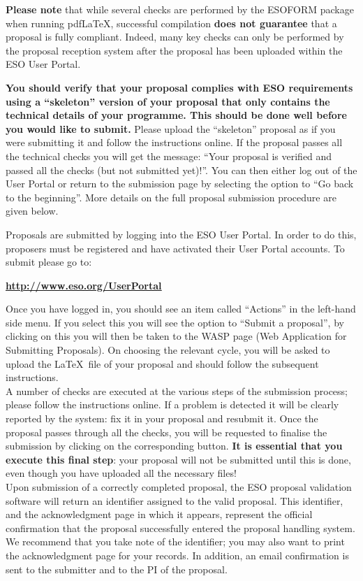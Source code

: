 \documentclass{article}
\begin{document}
{\bf Please note} that while several checks are
performed by the ESOFORM package when running pdf\LaTeX, successful
compilation {\bf does not guarantee} that a proposal is
fully compliant. Indeed, many key checks 
can only be performed by the proposal reception system after the proposal
has been uploaded within the ESO User Portal.

{\bf You should verify that your proposal complies with ESO
requirements using a ``skeleton'' version of  your proposal that
only contains the technical details of your  programme. This should be done well before you would like to submit.}
 Please upload the ``skeleton'' proposal as if you were submitting it and follow the instructions online.
If the proposal passes all the technical checks you will get the message:
``Your proposal is verified and passed all the checks (but not submitted yet)!''. 
You can then either log out of the User Portal or
return to the submission page by selecting the option to
``Go back to the beginning''.
More details on the full proposal submission procedure are given below.

Proposals are submitted by logging into the ESO User Portal.
In order to do this, proposers must be registered and have activated
their User Portal accounts. To submit please go to:
\begin{center}
  \href{http://www.eso.org/UserPortal}{\bf \underline{http://www.eso.org/UserPortal}}
\end{center}
Once you have logged in, you should see an item called ``Actions''  in the
left-hand side menu. If you select this you will see the option to
``Submit a proposal'', by clicking on this you will then be taken to the WASP page
(Web Application for Submitting Proposals). On choosing the relevant cycle,
you will be asked to upload the \LaTeX\ file of your proposal and should follow
the subsequent instructions. \\
A number
of checks are executed at the various steps of the submission process;
please follow the instructions online. If a problem is detected
it will be clearly reported by the system: fix it in your proposal and
resubmit it.
Once the proposal passes through all the checks, you will be requested to finalise the
submission by clicking on the corresponding button. {\bf It is
  essential that you execute this final step}: your proposal will not
be submitted until this is done, even though you have uploaded all the
necessary files! \\
 Upon submission of
a correctly completed proposal, the ESO proposal validation
software will return an identifier assigned to the valid proposal. This
identifier, and the acknowledgment page in which it appears, represent
the official confirmation that the proposal successfully entered the
proposal handling system. We recommend that you take note of the
identifier; you may also want to print the acknowledgment page for
your records. In addition, an email confirmation
is sent to the submitter and to the PI of the proposal.
\end{document}
